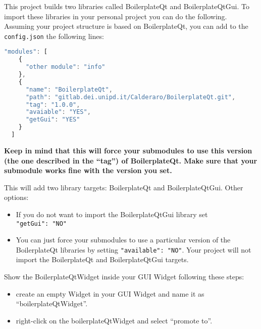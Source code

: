 
This project builds two libraries called BoilerplateQt and
BoilerplateQtGui. To import these libraries in your personal project you
can do the following. Assuming your project structure is based on
BoilerplateQt, you can add to the \texttt{config.json} the following
lines:

\begin{lstlisting}[language=javascript, gobble=2]
  "modules": [
    {
      "other module": "info"
    },
    {
      "name": "BoilerplateQt",
      "path": "gitlab.dei.unipd.it/Calderaro/BoilerplateQt.git",
      "tag": "1.0.0",
      "avaiable": "YES",
      "getGui": "YES"
    }
  ]
\end{lstlisting}

\textbf{Keep in mind that this will force your submodules to use this version (the one described in the ``tag'') of BoilerplateQt. Make sure that your submodule works fine with the version you set.}

This will add two library targets: BoilerplateQt and BoilerplateQtGui.
Other options:

\begin{itemize}
  \item
        If you do not want to import the BoilerplateQtGui library set
        \texttt{"getGui":\ "NO"}
\end{itemize}

\begin{itemize}
  \item
        You can just force your submodules to use a particular version of the
        BoilerplateQt libraries by setting \texttt{"available":\ "NO"}. Your
        project will not import the BoilerplateQt and BoilerplateQtGui
        targets.
\end{itemize}


Show the BoilerplateQtWidget inside your GUI Widget following these
steps:

\begin{itemize}
  \item
        create an empty Widget in your GUI Widget and name it as
        ``boilerplateQtWidget''.
\end{itemize}

\begin{itemize}
  \item
        right-click on the boilerplateQtWidget and select ``promote to''.
\end{itemize}

